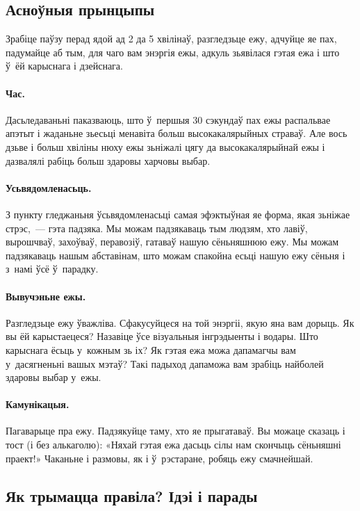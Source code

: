 \subsection{Асноўныя прынцыпы}

Зрабіце паўзу перад ядой ад 2 да 5 хвілінаў, разгледзьце ежу, адчуйце яе пах, падумайце аб тым, для чаго вам энэргія ежы, адкуль зьявілася гэтая ежа і што ў~ёй карыснага і дзейснага.

\paragraph{Час.}
Дасьледаваньні паказваюць, што ў~першыя 30 сэкундаў пах ежы распальвае апэтыт і жаданьне зьесьці менавіта больш высокакалярыйных страваў. Але вось дзьве і больш хвіліны нюху ежы зьніжалі цягу да высокакалярыйнай ежы і дазвалялі рабіць больш здаровы харчовы выбар.

\paragraph{Усьвядомленасьць.}
З пункту гледжаньня ўсьвядомленасьці самая эфэктыўная яе форма, якая зьніжае стрэс,~--- гэта падзяка. Мы можам падзякаваць тым людзям, хто лавіў, вырошчваў, захоўваў, перавозіў, гатаваў нашую сёньняшнюю ежу. Мы можам падзякаваць нашым абставінам, што можам спакойна есьці нашую ежу сёньня і з~намі ўсё ў~парадку.

\paragraph{Вывучэньне ежы.}
Разгледзьце ежу ўважліва. Сфакусуйцеся на той энэргіі, якую яна вам дорыць. Як вы ёй карыстаецеся? Назавіце ўсе візуальныя інгрэдыенты і водары. Што карыснага ёсьць у~кожным зь іх? Як гэтая ежа можа дапамагчы вам у~дасягненьні вашых мэтаў? Такі падыход дапаможа вам зрабіць найболей здаровы выбар у~ежы.

\paragraph{Камунікацыя.}
Пагаварыце пра ежу. Падзякуйце таму, хто яе прыгатаваў. Вы можаце сказаць і тост (і без алькаголю): «Няхай гэтая ежа дасьць сілы нам скончыць сёньняшні праект!» Чаканьне і размовы, як і ў~рэстаране, робяць ежу смачнейшай.

\subsection{Як трымацца правіла? Ідэі і парады}

